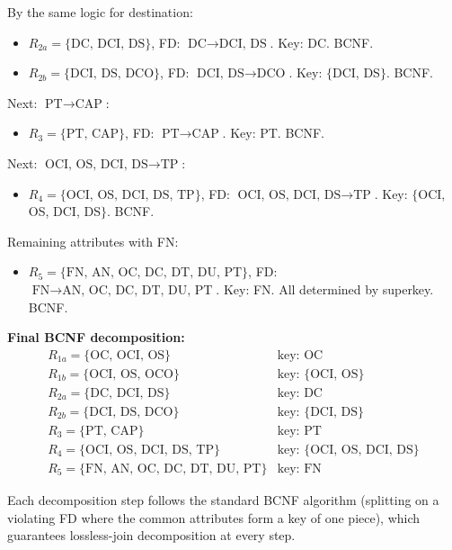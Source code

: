\documentclass[11pt]{article}
\begin{document}
By the same logic for destination:
\begin{itemize}
  \item $R_{2a} = \{\text{DC, DCI, DS}\}$, FD: $\text{DC} \to \text{DCI, DS}$. Key: DC. BCNF. \checkmark
  \item $R_{2b} = \{\text{DCI, DS, DCO}\}$, FD: $\text{DCI, DS} \to \text{DCO}$. Key: $\{$DCI, DS$\}$. BCNF. \checkmark
\end{itemize}

Next: $\text{PT} \to \text{CAP}$:
\begin{itemize}
  \item $R_3 = \{\text{PT, CAP}\}$, FD: $\text{PT} \to \text{CAP}$. Key: PT. BCNF. \checkmark
\end{itemize}

Next: $\text{OCI, OS, DCI, DS} \to \text{TP}$:
\begin{itemize}
  \item $R_4 = \{\text{OCI, OS, DCI, DS, TP}\}$, FD: $\text{OCI, OS, DCI, DS} \to \text{TP}$. Key: $\{$OCI, OS, DCI, DS$\}$. BCNF. \checkmark
\end{itemize}

Remaining attributes with FN:
\begin{itemize}
  \item $R_5 = \{\text{FN, AN, OC, DC, DT, DU, PT}\}$, FD: $\text{FN} \to \text{AN, OC, DC, DT, DU, PT}$. Key: FN. All determined by superkey. BCNF. \checkmark
\end{itemize}

\medskip
\noindent\textbf{Final BCNF decomposition:}
\[
\boxed{\begin{array}{ll}
R_{1a} = \{\text{OC, OCI, OS}\} & \text{key: OC} \\
R_{1b} = \{\text{OCI, OS, OCO}\} & \text{key: \{OCI, OS\}} \\
R_{2a} = \{\text{DC, DCI, DS}\} & \text{key: DC} \\
R_{2b} = \{\text{DCI, DS, DCO}\} & \text{key: \{DCI, DS\}} \\
R_3 = \{\text{PT, CAP}\} & \text{key: PT} \\
R_4 = \{\text{OCI, OS, DCI, DS, TP}\} & \text{key: \{OCI, OS, DCI, DS\}} \\
R_5 = \{\text{FN, AN, OC, DC, DT, DU, PT}\} & \text{key: FN}
\end{array}}
\]

Each decomposition step follows the standard BCNF algorithm (splitting on a violating FD where the common attributes form a key of one piece), which guarantees lossless-join decomposition at every step.
\end{document}
